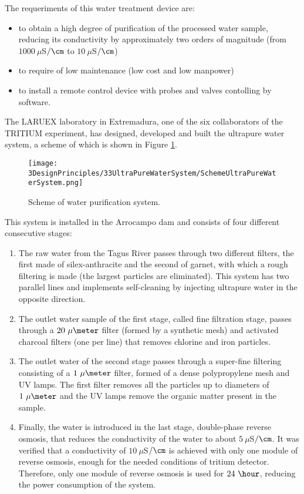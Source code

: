 The requeriments of this water treatment device are:

\begin{itemize}

\item{} to obtain a high degree of purification of the processed water sample, reducing its conductivity by approximately two orders of magnitude (from $1000~\mu$S$/\cm$ to $10~\mu$S$/\cm$)

\item{} to require of low maintenance (low cost  and low manpower)

\item{} to install a remote control device with probes and valves contolling by software.
\end{itemize}

The LARUEX laboratory in Extremadura, one of the six collaborators of the TRITIUM experiment, has designed, developed and built the ultrapure water system, a scheme of which is shown in Figure \ref{fig:WPSScheme}.

\begin{figure}[htbp]
\centering
\texttt{[image: 3DesignPrinciples/33UltraPureWaterSystem/SchemeUltraPureWaterSystem.png]}
\caption{Scheme of water purification system.\label{fig:WPSScheme}}
\end{figure}

This system is installed in the Arrocampo dam and consists of four different consecutive stages:

\begin{enumerate}
\item{} The raw water from the Tagus River passes through two different filters, the first made of silex-anthracite and the second of garnet, with which a rough filtering is made (the largest particles are eliminated). This system has two parallel lines and implements self-cleaning by injecting ultrapure water in the opposite direction.

\item{} The outlet water sample of the first stage, called fine filtration stage, passes through a $20~\mu\meter$ filter (formed by a synthetic mesh) and activated charcoal filters (one per line) that removes chlorine and iron particles.

\item{} The outlet water of the second stage passes through a super-fine filtering consisting of a $1~\mu\meter$ filter, formed of a dense polypropylene mesh and UV lamps. The first filter removes all the particles up to diameters of $1~\mu\meter$ and the UV lamps remove the organic matter present in the sample.

\item{} Finally, the water is introduced in the last stage, double-phase reverse osmosis, that reduces the conductivity of the water to about $5~\mu$S$/\cm$. It was verified that a conductivity of $10~\mu$S$/\cm$ is achieved with only one module of reverse osmosis, enough for the needed conditions of tritium detector. Therefore, only one module of reverse osmosis is used for $24~\hour$, reducing the power consumption of the system.

\end{enumerate}

